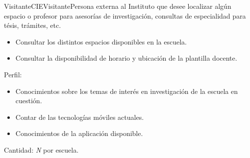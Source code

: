 \begin{actor}{Visitante}{CIEVisitante}{Persona externa al Instituto que desee localizar algún espacio o profesor para asesorías de investigación, consultas de especialidad para tésis, trámites, etc.}
\begin{itemize}
		  \item Consultar los distintos espacios disponibles en la escuela.
		  \item Consultar la disponibilidad de horario y ubicación de la plantilla docente.
	  
    \end{itemize}

    \item[Perfil:] \hspace{1pt}

	\begin{itemize}

	    \item Conocimientos sobre los temas de interés en investigación de la escuela en cuestión.
	    \item Contar de las tecnologías móviles actuales.
	    \item Conocimientos de la aplicación disponible.

	\end{itemize}

    \item[Cantidad:] \textit{N} por escuela.

\end{actor}

%
%
%
%
%
%
%
%
%
%
%


